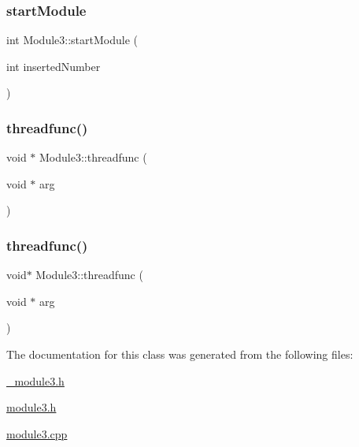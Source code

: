\subsubsection{\texorpdfstring{start\+Module}{startModule}\hspace{0.1cm}{\footnotesize\ttfamily [2/2]}}
{\footnotesize\ttfamily int Module3\+::start\+Module (\begin{DoxyParamCaption}\item[{int}]{inserted\+Number }\end{DoxyParamCaption})\hspace{0.3cm}{\ttfamily [slot]}}

\mbox{\label{class_module3_a21e8c133eee38224201d9826a6b08894}} 
\subsubsection{\texorpdfstring{threadfunc()}{threadfunc()}\hspace{0.1cm}{\footnotesize\ttfamily [1/2]}}
{\footnotesize\ttfamily void $\ast$ Module3\+::threadfunc (\begin{DoxyParamCaption}\item[{void $\ast$}]{arg }\end{DoxyParamCaption})}

\mbox{\label{class_module3_a38ac22b1c247687546a3b27dffc8e26a}} 
\subsubsection{\texorpdfstring{threadfunc()}{threadfunc()}\hspace{0.1cm}{\footnotesize\ttfamily [2/2]}}
{\footnotesize\ttfamily void$\ast$ Module3\+::threadfunc (\begin{DoxyParamCaption}\item[{void $\ast$}]{arg }\end{DoxyParamCaption})}



The documentation for this class was generated from the following files\+:\begin{DoxyCompactItemize}
\item 
\mbox{\hyperlink{__module3_8h}{\+\_\+module3.\+h}}\item 
\mbox{\hyperlink{module3_8h}{module3.\+h}}\item 
\mbox{\hyperlink{module3_8cpp}{module3.\+cpp}}\end{DoxyCompactItemize}
